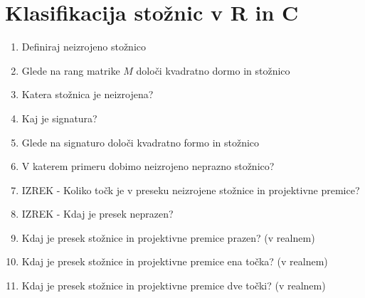 \documentclass{article}
\begin{document}
    \section{Klasifikacija stožnic v R in C}
    \begin{enumerate}
        \item Definiraj neizrojeno stožnico
        \item Glede na rang matrike $M$ določi kvadratno dormo in stožnico
        \item Katera stožnica je neizrojena?
        \item Kaj je signatura?
        \item Glede na signaturo določi kvadratno formo in stožnico
        \item V katerem primeru dobimo neizrojeno neprazno stožnico?
        \item IZREK - Koliko točk je v preseku neizrojene stožnice in projektivne premice?
        \item IZREK - Kdaj je presek neprazen?
        \item Kdaj je presek stožnice in projektivne premice prazen? (v realnem)
        \item Kdaj je presek stožnice in projektivne premice ena točka? (v realnem)
        \item Kdaj je presek stožnice in projektivne premice dve točki? (v realnem)
    \end{enumerate}
\end{document}
